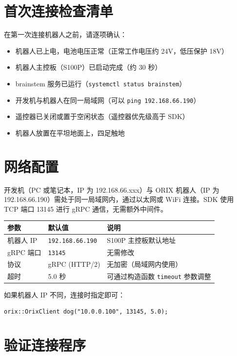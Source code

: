 \documentclass[a4paper,11pt,openany]{book}
\begin{document}
\section{首次连接检查清单}

在第一次连接机器人之前，请逐项确认：

\begin{itemize}[nosep]
  \item[$\square$] 机器人已上电，电池电压正常（正常工作电压约 24V，低压保护 18V）
  \item[$\square$] 机器人主控板（S100P）已启动完成（约 30 秒）
  \item[$\square$] brainstem 服务已运行（\texttt{systemctl status brainstem}）
  \item[$\square$] 开发机与机器人在同一局域网（可以 \texttt{ping 192.168.66.190}）
  \item[$\square$] 遥控器已关闭或置于空闲状态（遥控器优先级高于 SDK）
  \item[$\square$] 机器人放置在平坦地面上，四足触地
\end{itemize}

\section{网络配置}

开发机（PC 或笔记本，IP 为 192.168.66.xxx）与 ORIX 机器人（IP 为 192.168.66.190）需处于同一局域网内，通过以太网或 WiFi 连接。SDK 使用 TCP 端口 13145 进行 gRPC 通信，无需额外中间件。

\begin{longtable}{lll}
\toprule
参数 & 默认值 & 说明 \\
\midrule
\endhead
机器人 IP & \texttt{192.168.66.190} & S100P 主控板默认地址 \\
gRPC 端口 & \texttt{13145} & 无需修改 \\
协议 & gRPC (HTTP/2) & 无加密（局域网内使用） \\
超时 & 5.0 秒 & 可通过构造函数 \texttt{timeout} 参数调整 \\
\bottomrule
\end{longtable}

如果机器人 IP 不同，连接时指定即可：

\begin{lstlisting}[style=cpp]
orix::OrixClient dog("10.0.0.100", 13145, 5.0);
\end{lstlisting}

\section{验证连接程序}
\end{document}
